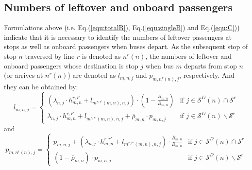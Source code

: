 \documentclass[smallextended]{svjour3}       %
\begin{document}
\begin{Abstract}
\subsection{Numbers of leftover and onboard passengers}\label{P and L}
Formulations above (i.e. Eq.(\ref{equ:totalB}), Eq.(\ref{equ:singleB}) and Eq.(\ref{equ:C})) indicate that 
it is necessary to identify the numbers of leftover passengers at stops as well as onboard passengers when buses depart.
As the subsequent stop of stop $n$ traversed by line $r$ is denoted as $n^{r}\left(n\right)$,
the numbers of leftover and onboard passengers
whose destination is stop $j$ 
when bus $m$ departs from stop $n$ (or arrives at $n^{r}\left(n\right)$)
are denoted as $l_{m,n,j}$ and $p_{m,n^{r}(n),j}$, respectively. 
And they can be obtained by:
\begin{equation}
  \label{equ:l}
  l_{m,n,j} = 
  \begin{cases} 
      \left(\lambda_{n,j}\cdot h_{m,n}^{r,r'}+l_{m^{r,r'}(m,n),n,j} \right)\cdot \left(1-\frac{\overline{B}_{m,n}}{B_{m,n}}\right)&\text{if } j \in \mathcal{S}^{D}(n)\cap\mathcal{S}^{r}\\
      \lambda_{n,j}\cdot h_{m,n}^{r,r'}+l_{m^{r,r'}(m,n),n,j}+\overline{\rho}_{m,n}\cdot p_{m,n,j}&\text{if } j \in \mathcal{S}^{D}(n)\backslash\mathcal{S}^{r}
  \end{cases}    
\end{equation}
and
\begin{equation}
    \label{equ:p}
    p_{m,n^{r}(n),j} = 
    \begin{cases} 
        p_{m,n,j} + \left(\lambda_{n,j}\cdot h_{m,n}^{r,r'}+l_{m^{r,r'}\left(m,n\right),n,j}\right)\cdot \frac{\overline{B}_{m,n}}{B_{m,n}}&\text{if } j \in \mathcal{S}^{D}(n)\cap\mathcal{S}^{r}\\
        \left(1-\overline{\rho}_{m,n}\right)\cdot p_{m,n,j}&\text{if } j \in \mathcal{S}^{D}(n)\backslash\mathcal{S}^{r}
    \end{cases}    
\end{equation}


\end{Abstract}
\end{document}
